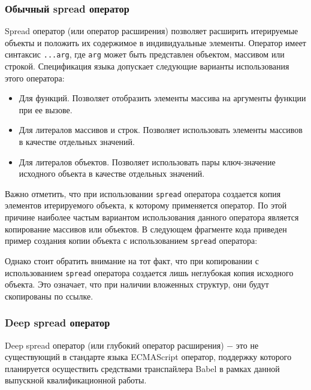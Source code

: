 \documentclass[14pt, a4paper]{article}
\def\code#1{\texttt{#1}} %
\begin{document}
\subsubsection{Обычный spread оператор}
Spread оператор (или оператор расширения)\cite{spread_mozilla} позволяет расширить итерируемые объекты и положить их 
содержимое в индивидуальные элементы. Оператор имеет синтаксис \code{...arg}, где 
\code{arg} может быть представлен объектом, массивом или строкой. Спецификация языка допускает следующие 
варианты использования этого оператора:
\begin{itemize}
  \item {Для функций. Позволяет отобразить элементы массива на аргументы функции при ее вызове.}
  
  \item {Для литералов массивов и строк. Позволяет использовать элементы массивов в качестве отдельных значений.}
  
  \item {Для литералов объектов. Позволяет использовать пары ключ-значение исходного объекта в качестве отдельных значений.}
  
\end{itemize}
Важно отметить, что при использовании \code{spread} оператора создается копия элементов 
итерируемого объекта, к которому применяется оператор. По этой причине наиболее частым вариантом 
использования данного оператора является копирование массивов или объектов. В следующем фрагменте 
кода приведен пример создания копии объекта с использованием \code{spread} оператора:

Однако стоит обратить внимание на тот факт, что при копировании с использованием \code{spread} оператора
создается лишь неглубокая копия исходного объекта. Это означает, что при наличии вложенных структур, 
они будут скопированы по ссылке. 

\subsubsection{Deep spread оператор}
Deep spread оператор (или глубокий оператор расширения) $-$ это не существующий в стандарте языка ECMAScript оператор, поддержку которого 
планируется осуществить средствами транспайлера Babel в рамках данной выпускной квалификационной работы.
\end{document}
